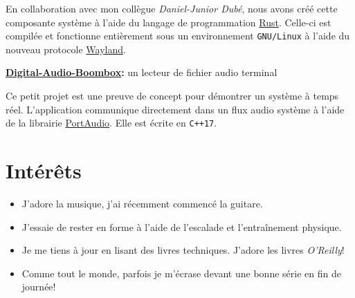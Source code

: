 \documentclass[french]{article}
\begin{document}
	En collaboration avec mon collègue \textit{Daniel-Junior Dubé}, nous avons créé cette composante système à l'aide du langage de programmation \href{https://www.rust-lang.org/}{Rust}. Celle-ci est compilée et fonctionne entièrement sous un environnement \texttt{GNU/Linux} à l'aide du nouveau protocole \href{https://wayland.freedesktop.org/}{Wayland}.

	\bigskip
	{\large \bfseries \href{https://github.com/Chabam/digital-audio-boombox}{Digital-Audio-Boombox}:}
	{\large un lecteur de fichier audio terminal}

	Ce petit projet est une preuve de concept pour démontrer un système à temps réel. L'application communique directement dans un flux audio système à l'aide de la librairie \href{http://www.portaudio.com/}{PortAudio}. Elle est écrite en \texttt{C++17}.

	\section{Intérêts}
	\begin{itemize}
		\item J'adore la musique, j'ai récemment commencé la guitare.
		\item J'essaie de rester en forme à l'aide de l'escalade et l'entraînement physique.
		\item Je me tiens à jour en lisant des livres techniques. J'adore les livres \textit{O'Reilly}!
		\item Comme tout le monde, parfois je m'écrase devant une bonne série en fin de journée!
	\end{itemize}
\end{document}
